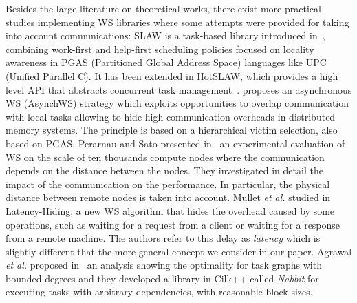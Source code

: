 Besides the large literature on theoretical works, there exist more practical studies implementing WS libraries where some attempts were provided for taking into account communications:
SLAW is a task-based library introduced in~\cite{Gue2010}, combining work-first
and help-first scheduling policies focused on locality awareness 
in PGAS (Partitioned Global Address Space) languages like UPC (Unified Parallel C). 
It has been extended in HotSLAW, which provides a high level API that abstracts concurrent task management~\cite{Seung-Jai2011}.
\cite{Shigang2013} proposes an asynchronous WS (AsynchWS) strategy which exploits opportunities to overlap communication with
local tasks allowing to hide high communication overheads in distributed memory systems. 
The principle is based on a hierarchical victim selection, also based on PGAS.
Perarnau and Sato presented in~\cite{swann2014} an experimental evaluation of WS on the scale of ten thousands compute nodes where the communication depends on the distance between the nodes.
They investigated in detail the impact of the communication on the performance. In particular, the physical distance between remote nodes is taken into account.
Mullet \textit{et al.} studied in~\cite{Muller2106} 
Latency-Hiding, a new WS algorithm that hides the overhead
caused by some operations, such as waiting for a request from a client or waiting
for a response from a remote machine.
The authors refer to this delay as \emph{latency} which is slightly
different that the more general concept we consider in our paper. 
Agrawal \textit{et al.} proposed in~\cite{Agrawal} an analysis showing the optimality for task graphs with bounded degrees
and they developed a library in Cilk++ called \textit{Nabbit} for executing tasks
with arbitrary dependencies, with reasonable block sizes.







